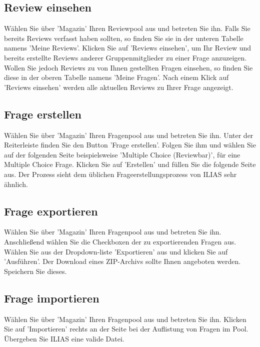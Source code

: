 \documentclass[12pt,a4paper]{scrreprt}
\begin{document}
\subsection{Review einsehen}
Wählen Sie über 'Magazin' Ihren Reviewpool aus und betreten Sie ihn. Falls Sie bereits Reviews verfasst haben sollten, so finden Sie sie in der unteren Tabelle namens 'Meine Reviews'. Klicken Sie auf 'Reviews einsehen', um Ihr Review und bereits erstellte Reviews anderer Gruppenmitglieder zu einer Frage anzuzeigen. Wollen Sie jedoch Reviews zu von Ihnen gestellten Fragen einsehen, so finden Sie diese in der oberen Tabelle namens 'Meine Fragen'. Nach einem Klick auf 'Reviews einsehen' werden alle aktuellen Reviews zu Ihrer Frage angezeigt.

\subsection{Frage erstellen}
Wählen Sie über 'Magazin' Ihren Fragenpool aus und betreten Sie ihn. Unter der Reiterleiste finden Sie den Button 'Frage erstellen'. Folgen Sie ihm und wählen Sie auf der folgenden Seite beispielsweise 'Multiple Choice (Reviewbar)', für eine Multiple Choice Frage. Klicken Sie auf 'Erstellen' und füllen Sie die folgende Seite aus. Der Prozess sieht dem üblichen Frageerstellungsprozess von ILIAS sehr ähnlich. 
		
\subsection{Frage exportieren}
Wählen Sie über 'Magazin' Ihren Fragenpool aus und betreten Sie ihn. Anschließend wählen Sie die Checkboxen der zu exportierenden Fragen aus. Wählen Sie aus der Dropdown-liste 'Exportieren' aus und klicken Sie auf 'Ausführen'. Der Download eines ZIP-Archivs sollte Ihnen angeboten werden. Speichern Sie dieses.
		
\subsection{Frage importieren}
Wählen Sie über 'Magazin' Ihren Fragenpool aus und betreten Sie ihn. Klicken Sie auf 'Importieren' rechts an der Seite bei der Auflistung von Fragen im Pool. Übergeben Sie ILIAS eine valide Datei. 
\end{document}
